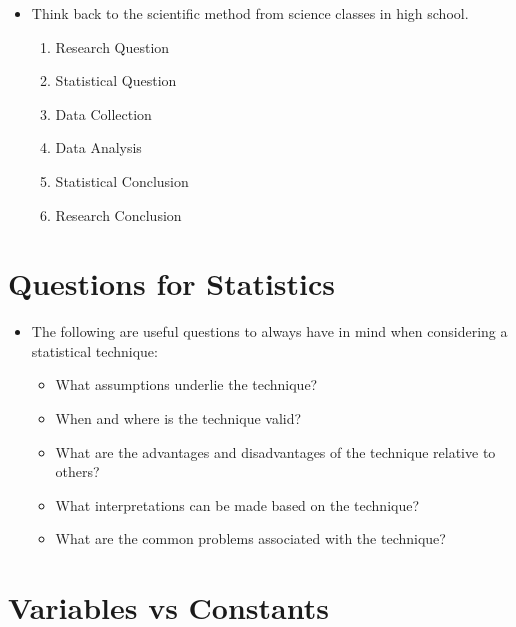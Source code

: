 \documentclass[12pt]{article}
\begin{document}
\begin{itemize}
\itemsep1pt\parskip0pt
\item
  Think back to the scientific method from science classes in high
  school.

  \begin{enumerate}
  \def\labelenumi{\arabic{enumi}.}
  \itemsep1pt\parskip0pt
  \item
    Research Question
  \item
    Statistical Question
  \item
    Data Collection
  \item
    Data Analysis
  \item
    Statistical Conclusion
  \item
    Research Conclusion
  \end{enumerate}
\end{itemize}

\section{Questions for Statistics}\label{questions-for-statistics}

\begin{itemize}
\itemsep1pt\parskip0pt
\item
  The following are useful questions to always have in mind when
  considering a statistical technique:

  \begin{itemize}
  \itemsep1pt\parskip0pt
  \item
    What assumptions underlie the technique?
  \item
    When and where is the technique valid?
  \item
    What are the advantages and disadvantages of the technique relative
    to others?
  \item
    What interpretations can be made based on the technique?
  \item
    What are the common problems associated with the technique?
  \end{itemize}
\end{itemize}

\section{Variables vs Constants}\label{variables-vs-constants}
\end{document}
